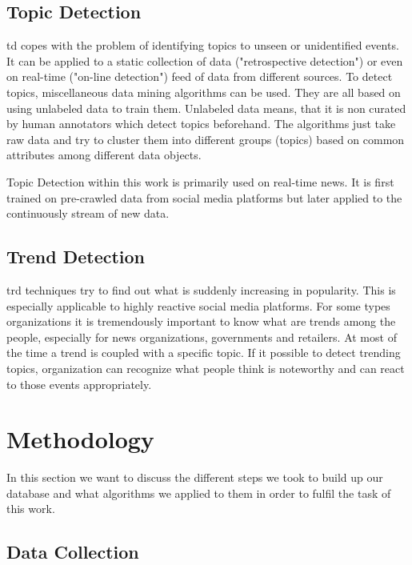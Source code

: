 \documentclass[11pt,titlepage,oneside,openany]{book}
\begin{document}
\section{Topic Detection}
\label{sec:topdec}

\acrfull{td} copes with the problem of identifying topics to unseen or unidentified events. It can be applied to a static collection of data ("retrospective detection") or even on real-time ("on-line detection") feed of data from different sources. To detect topics, miscellaneous data mining algorithms can be used. They are all based on using unlabeled data to train them. Unlabeled data means, that it is non curated by human annotators which detect topics beforehand. The algorithms just take raw data and try to cluster them into different groups (topics) based on common attributes among different data objects. \cite{Seo2004}

Topic Detection within this work is primarily used on real-time news. It is first trained on pre-crawled data from social media platforms but later applied to the continuously stream of new data.

\section{Trend Detection}
\label{sec:trenddec}

\acrfull{trd} techniques try to find out what is suddenly increasing in popularity. This is especially applicable to highly reactive social media platforms. For some types organizations it is tremendously important to know what are trends among the people, especially for news organizations, governments and retailers. 
At most of the time a trend is coupled with a specific topic. If it possible to detect trending topics, organization can recognize what people think is noteworthy and can react to those events appropriately. \cite{Kolb2015-07-16}

\chapter{Methodology}
\label{cha:methodology}

In this section we want to discuss the different steps we took to build up our database and what algorithms we applied to them in order to fulfil the task of this work.

\section{Data Collection}
\label{sec:datacoll}
\end{document}
